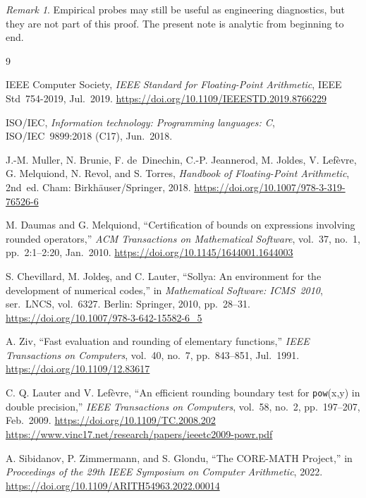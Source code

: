 \documentclass[11pt]{article}
\theoremstyle{plain}
\theoremstyle{remark}
\newtheorem{remark}{Remark}
\begin{document}
\begin{remark}
Empirical probes may still be useful as engineering diagnostics, but they are
not part of this proof.  The present note is analytic from beginning to end.
\end{remark}

\begin{thebibliography}{9}

IEEE Computer Society,
\textit{IEEE Standard for Floating-Point Arithmetic},
IEEE Std~754-2019, Jul.~2019.
\url{https://doi.org/10.1109/IEEESTD.2019.8766229}

ISO/IEC,
\textit{Information technology: Programming languages: C},
ISO/IEC~9899:2018 (C17), Jun.~2018.

J.-M. Muller, N. Brunie, F. de~Dinechin, C.-P. Jeannerod, M. Joldes,
V. Lef\`evre, G. Melquiond, N. Revol, and S. Torres,
\textit{Handbook of Floating-Point Arithmetic}, 2nd~ed.
Cham: Birkh\"auser/Springer, 2018.
\url{https://doi.org/10.1007/978-3-319-76526-6}

M. Daumas and G. Melquiond,
``Certification of bounds on expressions involving rounded operators,''
\textit{ACM Transactions on Mathematical Software},
vol.~37, no.~1, pp.~2:1--2:20, Jan.~2010.
\url{https://doi.org/10.1145/1644001.1644003}

S. Chevillard, M. Jolde\c{s}, and C. Lauter,
``Sollya: An environment for the development of numerical codes,''
in \textit{Mathematical Software: ICMS~2010}, ser.~LNCS, vol.~6327.
Berlin: Springer, 2010, pp.~28--31.
\url{https://doi.org/10.1007/978-3-642-15582-6_5}

A. Ziv,
``Fast evaluation and rounding of elementary functions,''
\textit{IEEE Transactions on Computers},
vol.~40, no.~7, pp.~843--851, Jul.~1991.
\url{https://doi.org/10.1109/12.83617}

C. Q. Lauter and V. Lef\`evre,
``An efficient rounding boundary test for \texttt{pow}(x,y) in double
precision,''
\textit{IEEE Transactions on Computers},
vol.~58, no.~2, pp.~197--207, Feb.~2009.
\url{https://doi.org/10.1109/TC.2008.202}
\newline
\url{https://www.vinc17.net/research/papers/ieeetc2009-powr.pdf}

A. Sibidanov, P. Zimmermann, and S. Glondu,
``The CORE-MATH Project,''
in \textit{Proceedings of the 29th IEEE Symposium on Computer Arithmetic},
2022.
\url{https://doi.org/10.1109/ARITH54963.2022.00014}

\end{thebibliography}
\end{document}
